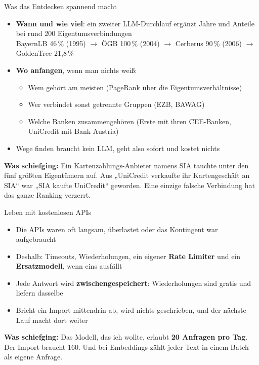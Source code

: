 \documentclass[aspectratio=169,11pt]{beamer}
\newcommand{\hl}[1]{\textcolor{midblue}{\textbf{#1}}}
\newcommand{\story}[1]{\par\vspace{6pt}\small\textcolor{softred}{\textbf{Was schiefging:}} #1}
\begin{document}
\begin{frame}{Was das Entdecken spannend macht}
  \begin{itemize}
    \item \hl{Wann und wie viel}: ein zweiter LLM-Durchlauf ergänzt Jahre und Anteile bei rund 200 Eigentumsverbindungen\\
      \small BayernLB 46\,\% (1995) $\rightarrow$ ÖGB 100\,\% (2004) $\rightarrow$ Cerberus 90\,\% (2006) $\rightarrow$ GoldenTree 21,8\,\%
    \item \hl{Wo anfangen}, wenn man nichts weiß:
      \begin{itemize}\small
        \item Wem gehört am meisten (PageRank über die Eigentumsverhältnisse)
        \item Wer verbindet sonst getrennte Gruppen (EZB, BAWAG)
        \item Welche Banken zusammengehören (Erste mit ihren CEE-Banken, UniCredit mit Bank Austria)
      \end{itemize}
    \item Wege finden braucht kein LLM, geht also sofort und kostet nichts
  \end{itemize}
  \story{Ein Kartenzahlungs-Anbieter namens SIA tauchte unter den fünf größten Eigentümern auf.
    Aus „UniCredit verkaufte ihr Kartengeschäft an SIA“ war „SIA kaufte UniCredit“ geworden.
    Eine einzige falsche Verbindung hat das ganze Ranking verzerrt.}
\end{frame}

\begin{frame}{Leben mit kostenlosen APIs}
  \begin{itemize}
    \item Die APIs waren oft langsam, überlastet oder das Kontingent war aufgebraucht
    \item Deshalb: Timeouts, Wiederholungen, ein eigener \hl{Rate Limiter} und ein
          \hl{Ersatzmodell}, wenn eins ausfällt
    \item Jede Antwort wird \hl{zwischengespeichert}: Wiederholungen sind gratis und liefern dasselbe
    \item Bricht ein Import mittendrin ab, wird nichts geschrieben, und der nächste Lauf macht dort weiter
  \end{itemize}
  \story{Das Modell, das ich wollte, erlaubt \hl{20 Anfragen pro Tag}. Der Import braucht 160.
    Und bei Embeddings zählt jeder Text in einem Batch als eigene Anfrage.}
\end{frame}
\end{document}
